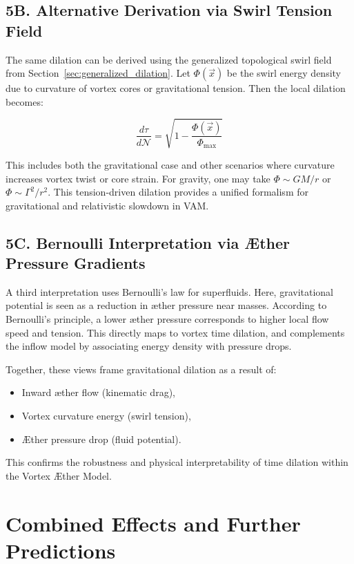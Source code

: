 \documentclass[a4paper,12pt]{article}
\begin{document}
\subsection*{5B. Alternative Derivation via Swirl Tension Field}

The same dilation can be derived using the generalized topological swirl field from Section~\ref{sec:generalized_dilation}. Let $\Phi(\vec{x})$ be the swirl energy density due to curvature of vortex cores or gravitational tension. Then the local dilation becomes:

\[
\frac{d\tau}{d\mathcal{N}} = \sqrt{1 - \frac{\Phi(\vec{x})}{\Phi_{\text{max}}}}
\]

This includes both the gravitational case and other scenarios where curvature increases vortex twist or core strain. For gravity, one may take $\Phi \sim GM/r$ or $\Phi \sim \Gamma^2/r^2$. This tension-driven dilation provides a unified formalism for gravitational and relativistic slowdown in VAM.

\subsection*{5C. Bernoulli Interpretation via Æther Pressure Gradients}

A third interpretation uses Bernoulli's law for superfluids. Here, gravitational potential is seen as a reduction in æther pressure near masses. According to Bernoulli's principle, a lower æther pressure corresponds to higher local flow speed and tension. This directly maps to vortex time dilation, and complements the inflow model by associating energy density with pressure drops.

Together, these views frame gravitational dilation as a result of:
\begin{itemize}
    \item Inward æther flow (kinematic drag),
    \item Vortex curvature energy (swirl tension),
    \item Æther pressure drop (fluid potential).
\end{itemize}

This confirms the robustness and physical interpretability of time dilation within the Vortex Æther Model.

\section{Combined Effects and Further Predictions}
\end{document}
